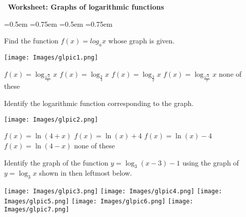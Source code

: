 \documentclass[12pt,
]{exam}
\newcounter{quest}
\newcommand{\worksheetdate}{ 2024}
\newcommand{\coursetitle}{}
\newcommand{\worksheettitle}{Graphs of logarithmic functions}
\begin{document}

\begin{center}	
{\bf {\coursetitle\,  Worksheet: \worksheettitle} 
	\\ 
	\textbf{}
	\hphantom{\worksheetdate}
} 		
	\end{center}




\begin{questions}

\abovedisplayshortskip=0.5em
\belowdisplayshortskip=0.75em
\abovedisplayskip=0.5em
\belowdisplayskip=0.75em


\question
Find the  function $f(x)=log_a x$ whose graph is given.
\begin{multicols}{2}
\begin{center}
       \texttt{[image: Images/glpic1.png]}
 \end{center}
\columnbreak
\begin{choices}
\choice $f(x)=\log_{\frac{\sqrt{2}}{3}}x$
\choice $f(x)=\log_{\frac{2}{3}}x$
\choice $f(x)=\log_{\frac{3}{2}}x$
\choice $f(x)=\log_{\frac{\sqrt{3}}{2}}x$
\choice none of these
\end{choices}

\end{multicols}

\question
Identify the logarithmic function corresponding to the graph.
\begin{multicols}{2}
\begin{center}
       \texttt{[image: Images/glpic2.png]}
 \end{center}
\columnbreak
\begin{choices}
\choice $f(x)=\ln (4+x)$
\choice $f(x)=\ln (x) +4$
\choice $f(x)=\ln(x) -4$
\choice $f(x)=\ln (4-x)$
\choice none of these
\end{choices}

\end{multicols}


\question
Identify the graph of the function $y = \log _3 (x-3)-1$  using the graph of $y=\log_3 x$ shown in then leftmost below.

\texttt{[image: Images/glpic3.png]}
     \texttt{[image: Images/glpic4.png]}
          \texttt{[image: Images/glpic5.png]}
               \texttt{[image: Images/glpic6.png]}
                    \texttt{[image: Images/glpic7.png]}
   

\end{questions}
\end{document}
